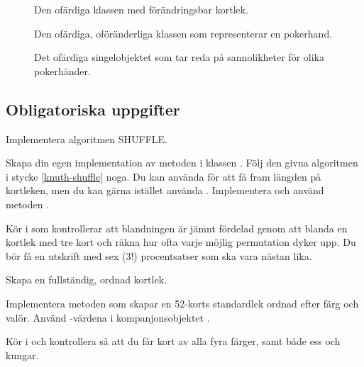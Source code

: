 \begin{figure}
\caption{Den ofärdiga klassen  med förändringsbar kortlek.}
\label{shuffle:fig-deck}
\end{figure}



\begin{figure}
\caption{Den ofärdiga, oföränderliga klassen  som representerar en pokerhand.}
\label{shuffle:fig-hand}
\end{figure}

\begin{figure}
\caption{Det ofärdiga singelobjektet  som tar reda på sannolikheter för olika pokerhänder.}
\label{shuffle:fig-pokerprob}
\end{figure}


\subsection{Obligatoriska uppgifter}\label{subsection:lab:shuffle:tasks}


\Task Implementera algoritmen SHUFFLE.

\Subtask Skapa din egen implementation av metoden  i klassen . Följ den givna algoritmen i stycke \ref{knuth-shuffle} noga. Du kan använda  för att få fram längden på kortleken, men du kan gärna istället använda . Implementera och använd metoden  .

\Subtask Kör  i  som kontrollerar att blandningen är jämnt fördelad genom att blanda en kortlek med tre kort och räkna hur ofta varje möjlig permutation dyker upp. Du bör få en utskrift med sex ($3!$) procentsatser som ska vara nästan lika.


\Task Skapa en fullständig, ordnad kortlek.

\Subtask Implementera metoden  som skapar en 52-korts standardlek ordnad efter färg och valör. Använd -värdena i kompanjonsobjektet .

\Subtask Kör  i  och kontrollera så att du får kort av alla fyra färger, samt både ess och kungar.


